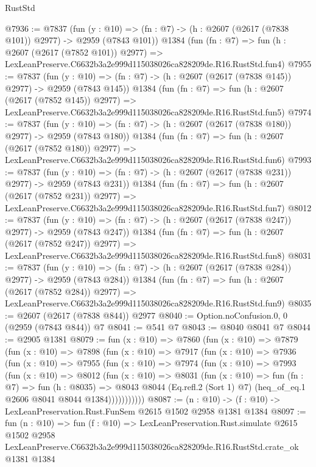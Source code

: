 \begin{lexlean}{RustStd}
\begin{coremodule}
@7936 := @7837
    (fun (y : @10) => (fn : @7) -> (h : @2607 (@2617 (@7838 @101)) @2977) -> @2959 (@7843 @101))
    @1384
    (fun (fn : @7) =>
    fun (h : @2607 (@2617 (@7852 @101)) @2977) =>
    LexLeanPreserve.C6632b3a2e999d115038026ca828209de.R16.RustStd.fun4)
@7955 := @7837
    (fun (y : @10) => (fn : @7) -> (h : @2607 (@2617 (@7838 @145)) @2977) -> @2959 (@7843 @145))
    @1384
    (fun (fn : @7) =>
    fun (h : @2607 (@2617 (@7852 @145)) @2977) =>
    LexLeanPreserve.C6632b3a2e999d115038026ca828209de.R16.RustStd.fun5)
@7974 := @7837
    (fun (y : @10) => (fn : @7) -> (h : @2607 (@2617 (@7838 @180)) @2977) -> @2959 (@7843 @180))
    @1384
    (fun (fn : @7) =>
    fun (h : @2607 (@2617 (@7852 @180)) @2977) =>
    LexLeanPreserve.C6632b3a2e999d115038026ca828209de.R16.RustStd.fun6)
@7993 := @7837
    (fun (y : @10) => (fn : @7) -> (h : @2607 (@2617 (@7838 @231)) @2977) -> @2959 (@7843 @231))
    @1384
    (fun (fn : @7) =>
    fun (h : @2607 (@2617 (@7852 @231)) @2977) =>
    LexLeanPreserve.C6632b3a2e999d115038026ca828209de.R16.RustStd.fun7)
@8012 := @7837
    (fun (y : @10) => (fn : @7) -> (h : @2607 (@2617 (@7838 @247)) @2977) -> @2959 (@7843 @247))
    @1384
    (fun (fn : @7) =>
    fun (h : @2607 (@2617 (@7852 @247)) @2977) =>
    LexLeanPreserve.C6632b3a2e999d115038026ca828209de.R16.RustStd.fun8)
@8031 := @7837
    (fun (y : @10) => (fn : @7) -> (h : @2607 (@2617 (@7838 @284)) @2977) -> @2959 (@7843 @284))
    @1384
    (fun (fn : @7) =>
    fun (h : @2607 (@2617 (@7852 @284)) @2977) =>
    LexLeanPreserve.C6632b3a2e999d115038026ca828209de.R16.RustStd.fun9)
@8035 := @2607 (@2617 (@7838 @844)) @2977
@8040 := Option.noConfusion.{0, 0} (@2959 (@7843 @844)) @7
@8041 := @541 @7
@8043 := @8040 @8041 @7
@8044 := @2905 @1381
@8079 := fun (x : @10) =>
  @7860
    (fun (x : @10) =>
    @7879
      (fun (x : @10) =>
      @7898
        (fun (x : @10) =>
        @7917
          (fun (x : @10) =>
          @7936
            (fun (x : @10) =>
            @7955
              (fun (x : @10) =>
              @7974
                (fun (x : @10) =>
                @7993
                  (fun (x : @10) =>
                  @8012
                    (fun (x : @10) =>
                    @8031
                      (fun (x : @10) =>
                      fun (fn : @7) =>
                      fun (h : @8035) =>
                      @8043
                        @8044
                        (Eq.refl.{2} (Sort 1) @7)
                        (heq_of_eq.{1} @2606 @8041 @8044 @1384)))))))))))
@8087 := (n : @10) -> (f : @10) -> LexLeanPreservation.Rust.FunSem @2615 @1502 @2958 @1381 @1384
@8097 := fun (n : @10) =>
  fun (f : @10) =>
  LexLeanPreservation.Rust.simulate
    @2615
    @1502
    @2958
    LexLeanPreserve.C6632b3a2e999d115038026ca828209de.R16.RustStd.crate_ok
    @1381
    @1384
\end{coremodule}
\end{lexlean}

